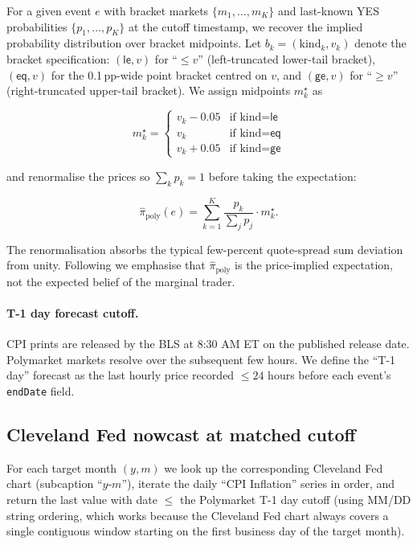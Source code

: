\documentclass{article}
\begin{document}
For a given event $e$ with bracket markets $\{m_1, \ldots, m_K\}$ and
last-known YES probabilities $\{p_1, \ldots, p_K\}$ at the cutoff
timestamp, we recover the implied probability distribution over
bracket midpoints.  Let $b_k = (\text{kind}_k, v_k)$ denote the
bracket specification: $(\textsf{le}, v)$ for ``$\le v$''
(left-truncated lower-tail bracket), $(\textsf{eq}, v)$ for the
0.1\,pp-wide point bracket centred on $v$, and $(\textsf{ge}, v)$ for
``$\ge v$'' (right-truncated upper-tail bracket).  We assign midpoints
$m_k^{\star}$ as

\begin{equation*}
m_k^{\star} = \begin{cases}
v_k - 0.05 & \text{if kind} = \textsf{le} \\
v_k        & \text{if kind} = \textsf{eq} \\
v_k + 0.05 & \text{if kind} = \textsf{ge}
\end{cases}
\end{equation*}

\noindent
and renormalise the prices so $\sum_k p_k = 1$ before taking the
expectation:

\begin{equation*}
\hat{\pi}_{\text{poly}}(e) = \sum_{k=1}^{K}
   \frac{p_k}{\sum_{j} p_j} \cdot m_k^{\star}.
\end{equation*}

\noindent
The renormalisation absorbs the typical few-percent quote-spread sum
deviation from unity.  Following \citet{manski2006interpreting} we
emphasise that $\hat{\pi}_{\text{poly}}$ is the price-implied
expectation, not the expected belief of the marginal trader.

\paragraph{T-1 day forecast cutoff.}  CPI prints are released by the
BLS at 8:30 AM ET on the published release date.  Polymarket markets
resolve over the subsequent few hours.  We define the ``T-1 day''
forecast as the last hourly price recorded $\le 24$ hours before each
event's \texttt{endDate} field.

\subsection{Cleveland Fed nowcast at matched cutoff}

For each target month $(y, m)$ we look up the corresponding Cleveland
Fed chart (subcaption ``$y$-$m$''), iterate the daily ``CPI Inflation''
series in order, and return the last value with date $\le$ the
Polymarket T-1 day cutoff (using MM/DD string ordering, which works
because the Cleveland Fed chart always covers a single contiguous
window starting on the first business day of the target month).
\end{document}
